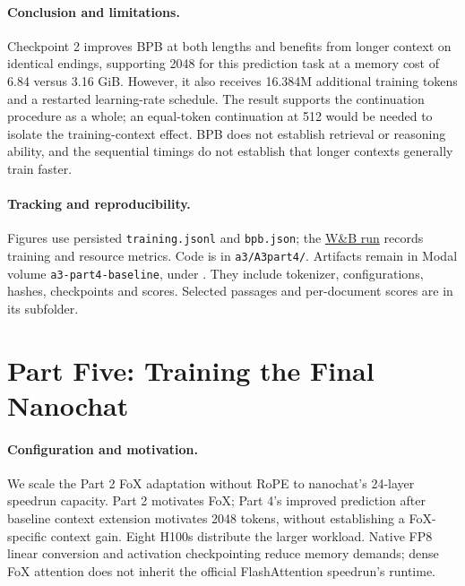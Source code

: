 \documentclass[11pt]{article}
\begin{document}
\paragraph{Conclusion and limitations.}
Checkpoint 2 improves BPB at both lengths and benefits from longer context
on identical endings, supporting 2048 for this prediction task at a memory
cost of 6.84 versus 3.16 GiB. However, it also receives 16.384M additional
training tokens and a restarted learning-rate schedule. The result supports
the continuation procedure as a whole; an equal-token continuation at 512
would be needed to isolate the training-context effect. BPB does not establish
retrieval or reasoning ability, and the sequential timings do not establish
that longer contexts generally train faster.

\paragraph{Tracking and reproducibility.}
Figures use persisted \texttt{training.jsonl} and \texttt{bpb.json}; the
\href{https://wandb.ai/jerry-zeng-university-of-toronto/a3-part4-baseline/runs/i2er0zqi}{W\&B run}
records training and resource metrics. Code is in \texttt{a3/A3part4/}.
Artifacts remain in Modal volume \texttt{a3-part4-baseline}, under
. They include tokenizer, configurations,
hashes, checkpoints and scores. Selected passages and per-document scores
are in its  subfolder.

\clearpage

\section{Part Five: Training the Final Nanochat}
\label{sec:p5}

\paragraph{Configuration and motivation.}
We scale the Part 2 FoX adaptation without RoPE\cite{p5-fox} to nanochat's
24-layer speedrun capacity\cite{p5-nanochat}. Part 2 motivates FoX; Part 4's
improved prediction after baseline context extension motivates 2048 tokens,
without establishing a FoX-specific context gain. Eight H100s distribute the
larger workload. Native FP8 linear conversion and activation checkpointing
reduce memory demands; dense FoX attention does not inherit the official
FlashAttention speedrun's runtime.
\end{document}
